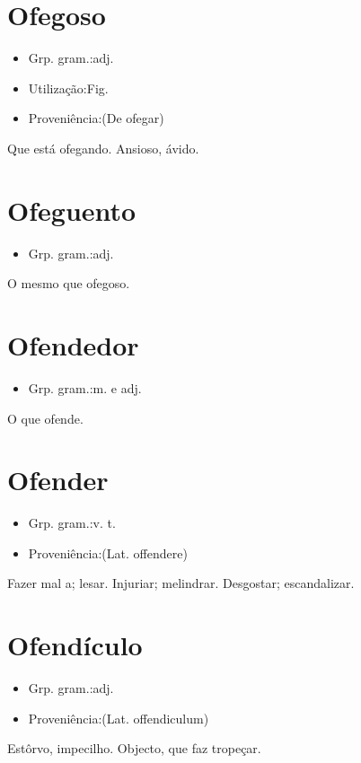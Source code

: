 \section{Ofegoso}
\begin{itemize}
\item {Grp. gram.:adj.}
\end{itemize}
\begin{itemize}
\item {Utilização:Fig.}
\end{itemize}
\begin{itemize}
\item {Proveniência:(De \textunderscore ofegar\textunderscore )}
\end{itemize}
Que está ofegando.
Ansioso, ávido.
\section{Ofeguento}
\begin{itemize}
\item {Grp. gram.:adj.}
\end{itemize}
O mesmo que \textunderscore ofegoso\textunderscore .
\section{Ofendedor}
\begin{itemize}
\item {Grp. gram.:m.  e  adj.}
\end{itemize}
O que ofende.
\section{Ofender}
\begin{itemize}
\item {Grp. gram.:v. t.}
\end{itemize}
\begin{itemize}
\item {Proveniência:(Lat. \textunderscore offendere\textunderscore )}
\end{itemize}
Fazer mal a; lesar.
Injuriar; melindrar.
Desgostar; escandalizar.
\section{Ofendículo}
\begin{itemize}
\item {Grp. gram.:adj.}
\end{itemize}
\begin{itemize}
\item {Proveniência:(Lat. \textunderscore offendiculum\textunderscore )}
\end{itemize}
Estôrvo, impecilho.
Objecto, que faz tropeçar.
